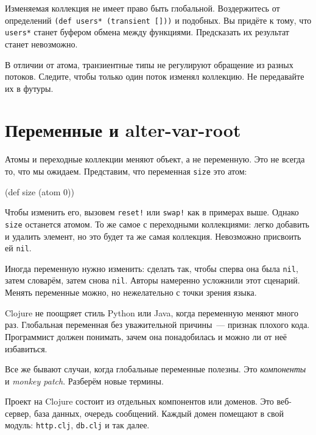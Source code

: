 Изменяемая коллекция не имеет право быть глобальной. Воздержитесь от определений
\verb|(def users* (transient []))| и подобных. Вы придёте к тому, что
\verb|users*| станет буфером обмена между функциями. Предсказать их результат
станет невозможно.

В отличии от атома, транзиентные типы не регулируют обращение из разных
потоков. Следите, чтобы только один поток изменял коллекцию. Не передавайте их в
футуры.

\section{Переменные и alter-var-root}


\label{alter-var-root}

Атомы и переходные коллекции меняют объект, а не переменную. Это не всегда то,
что мы ожидаем. Представим, что переменная \verb|size| это атом:

\begin{english}
  \begin{clojure}
(def size (atom 0))
  \end{clojure}
\end{english}

Чтобы изменить его, вызовем \verb|reset!| или \verb|swap!| как в примерах
выше. Однако \verb|size| останется атомом. То же самое с переходными
коллекциями: легко добавить и удалить элемент, но это будет та же самая
коллекция. Невозможно присвоить ей \verb|nil|.

Иногда переменную нужно изменить: сделать так, чтобы сперва она была
\verb|nil|, затем словарём, затем снова \verb|nil|. Авторы намеренно
усложнили этот сценарий. Менять переменные можно, но нежелательно с точки зрения
языка.


Clojure не поощряет стиль Python или Java, когда переменную меняют много
раз. Глобальная переменная без уважительной причины~--- признак плохого кода.
Программист должен понимать, зачем она понадобилась и можно ли от неё
избавиться.


Все же бывают случаи, когда глобальные переменные полезны. Это \emph{компоненты}
и \emph{monkey patch}. Разберём новые термины.

Проект на Clojure состоит из отдельных компонентов или доменов. Это веб-сервер,
база данных, очередь сообщений. Каждый домен помещают в свой модуль:
\verb|http.clj|, \verb|db.clj| и так далее.

